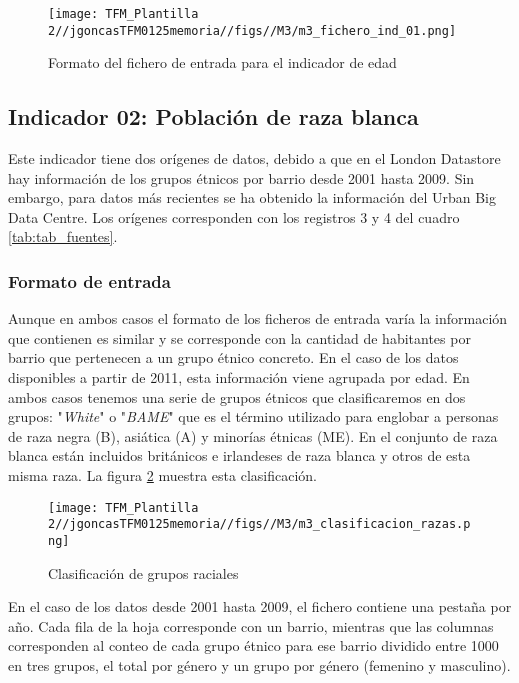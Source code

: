 \documentclass[12pt,a4paper,twoside]{book}
\begin{document}
\begin{figure}
    \centering
    \texttt{[image: TFM\_Plantilla 2//jgoncasTFM0125memoria//figs//M3/m3\_fichero\_ind\_01.png]}
    \caption{Formato del fichero de entrada para el indicador de edad}
    \label{fig:fig_fichero_ind_01}
\end{figure}

\subsection{Indicador 02: Población de raza blanca}

Este indicador tiene dos orígenes de datos, debido a que en el London Datastore hay información de los grupos étnicos por barrio desde 2001 hasta 2009. Sin embargo, para datos más recientes se ha obtenido la información del Urban Big Data Centre. Los orígenes corresponden con los registros 3 y 4 del cuadro \ref{tab:tab_fuentes}.

\subsubsection{Formato de entrada}

Aunque en ambos casos el formato de los ficheros de entrada varía la información que contienen es similar y se corresponde con la cantidad de habitantes por barrio que pertenecen a un grupo étnico concreto. En el caso de los datos disponibles a partir de 2011, esta información viene agrupada por edad. En ambos casos tenemos una serie de grupos étnicos que clasificaremos en dos grupos: "\textit{White}" o "\textit{BAME}" que es el término utilizado para englobar a personas de raza negra (B), asiática (A) y minorías étnicas (ME). En el conjunto de raza blanca están incluidos británicos e irlandeses de raza blanca y otros de esta misma raza. La figura \ref{fig:fig_clasificacion_razas} muestra esta clasificación.

\begin{figure}
    \centering
    \texttt{[image: TFM\_Plantilla 2//jgoncasTFM0125memoria//figs//M3/m3\_clasificacion\_razas.png]}
    \caption{Clasificación de grupos raciales}
    \label{fig:fig_clasificacion_razas}
\end{figure}

En el caso de los datos desde 2001 hasta 2009, el fichero contiene una pestaña por año. Cada fila de la hoja corresponde con un barrio, mientras que las columnas corresponden al conteo de cada grupo étnico para ese barrio dividido entre 1000 en tres grupos, el total por género y un grupo por género (femenino y masculino).
\end{document}
